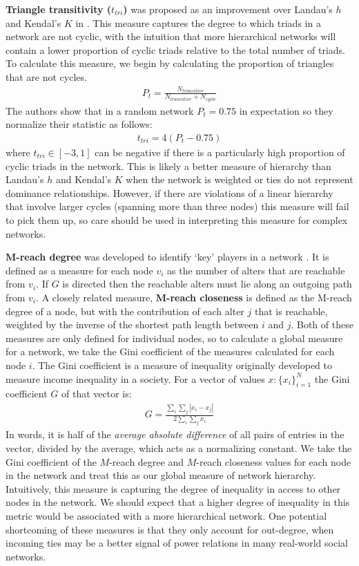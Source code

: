 \documentclass[3p,times]{elsarticle}
\begin{document}
\textbf{Triangle transitivity ($t_{tri}$)} was proposed as an improvement over Landau's $h$ and Kendal's $K$ in \cite{Shizuka2012}. This measure captures the degree to which triads in a network are not cyclic, with the intuition that more hierarchical networks will contain a lower proportion of cyclic triads relative to the total number of triads. To calculate this measure, we begin by calculating the proportion of triangles that are not cycles.
\begin{align}
	P_t = \frac{N_{transitive}}{N_{transitive} + N_{cycle}}
\end{align}
The authors show that in a random network $P_t = 0.75$ in expectation so they normalize their statistic as follows:
\begin{align}
	t_{tri} = 4(P_t - 0.75)
\end{align}
where $t_{tri} \in [-3,1]$ can be negative if there is a particularly high proportion of cyclic triads in the network. This is likely a better measure of hierarchy than Landau's $h$ and Kendal's $K$ when the network is weighted or ties do not represent dominance relationships. However, if there are violations of a linear hierarchy that involve larger cycles (spanning more than three nodes) this measure will fail to pick them up, so care should be used in interpreting this measure for complex networks.

\textbf{$\mathbf{M}$-reach degree} was developed to identify `key' players in a network \cite{key}.  It is defined as a measure for each node $v_{i}$ as the number of alters that are reachable from $v_{i}.$ If $G$ is directed then the reachable alters must lie along an outgoing path from $v_{i}$. A closely related measure, \textbf{$\mathbf{M}$-reach closeness} is defined as the M-reach degree of a node, but with the contribution of each alter $j$ that is reachable, weighted by the inverse of the shortest path length between $i$ and $j$. Both of these measures are only defined for individual nodes, so to calculate a global measure for a network, we take the Gini coefficient of the measures calculated for each node $i$. The Gini  coefficient \cite{Yitzhaki1979} is a measure of inequality originally developed to measure income inequality in a society. For a vector of values $x : \{x_i\}_{i=1}^{N}$ the Gini coefficient $G$ of that vector is:
\begin{align}
	G = \frac{\displaystyle{\sum_i \sum_j \left| x_i - x_j \right|}}{\displaystyle{2 \sum_i \sum_j x_i}}
\end{align}
In words, it is half of the \emph{average absolute difference} of all pairs of entries in the vector, divided by the average, which acts as a normalizing constant. We take the Gini coefficient of the $M$-reach degree and $M$-reach closeness values for each node in the network and treat this as our global measure of network hierarchy. Intuitively, this measure is capturing the degree of inequality in access to other nodes in the network. We should expect that a higher degree of inequality in this metric would be associated with a more hierarchical network. One potential shortcoming of these measures is that they only account for out-degree, when incoming ties may be a better signal of power relations in many real-world social networks.
\end{document}

